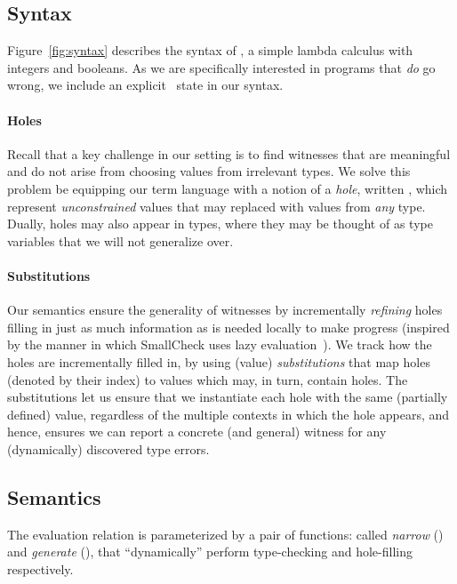 \subsection{Syntax}
\label{sec:syntax}

%
Figure~\ref{fig:syntax} describes the syntax of \lang, a simple lambda
calculus with integers and booleans.
%
As we are specifically interested in programs that \emph{do} go wrong,
we include an explicit \stuck\ state in our syntax.

\paragraph{Holes}
\label{sec:holes}
%
Recall that a key challenge in our setting is to find witnesses
that are meaningful and do not arise from choosing values from
irrelevant types.
%
We solve this problem be equipping our term language with a notion
of a \emph{hole}, written \ehole{}, which represent \emph{unconstrained}
values that may replaced with values from \emph{any} type.
%
Dually, holes may also appear in types, where they may be thought
of as type variables that we will not generalize over.
%

\paragraph{Substitutions}
%
Our semantics ensure the generality of witnesses by incrementally
\emph{refining} holes filling in just as much information as is
needed locally to make progress (inspired by the manner in
which SmallCheck uses lazy evaluation~\cite{smallcheck}).
%
We track how the holes are incrementally filled in, by using
(value) \emph{substitutions} that map holes (denoted by their index)
to values which may, in turn, contain holes.
%
The substitutions let us ensure that we instantiate each hole
with the same (partially defined) value, regardless of the multiple
contexts in which the hole appears, and hence, ensures we can
report a concrete (and general) witness for any (dynamically)
discovered type errors.

\subsection{Semantics}
\label{sec:semantics}

%

The evaluation relation is parameterized by a pair of functions:
called \emph{narrow} (\forcesym) and \emph{generate} (\gensym),
that ``dynamically'' perform type-checking and hole-filling
respectively.

